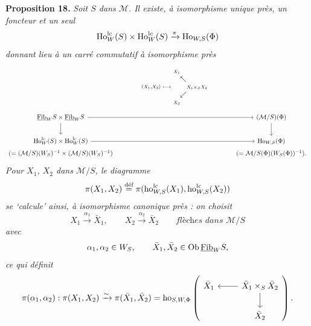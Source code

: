 \textbf{Proposition 18.} \textit{Soit $S$ dans $\mathcal{M}$. Il existe, à isomorphisme unique près, un foncteur et un seul}
\[
\mathrm{Ho}^{\mathrm{lc}}_W(S) \times \mathrm{Ho}^{\mathrm{lc}}_W(S) \xrightarrow{\pi} \mathrm{Ho}_{W,S}(\Phi)
\]
\textit{donnant lieu à un carré commutatif à isomorphisme près}
\[
\begin{tikzcd}[ampersand replacement=\&, column sep=large]
 \& {\scriptstyle (X_1,X_2)\ \longmapsto\ \begin{array}{@{}c@{}c@{}c@{}} \scriptstyle X_1 & & \\ & \nwarrow & \\ & & \scriptstyle X_1 \times_S X_2 \\ & \swarrow & \\ \scriptstyle X_2 & & \end{array}} \& \\[-3ex]
\Fibu_W S \times \Fibu_W S \arrow[rr] \arrow[d] \& \& (\mathcal{M}/S)(\Phi) \arrow[d] \\
\Ho^{\lc}_W(S) \times \Ho^{\lc}_W(S) \arrow[rr] \& \& \Ho_{W,S}(\Phi) \\[-4ex]
(= (\mathcal{M}/S)(W_S)^{-1} \times (\mathcal{M}/S)(W_S)^{-1}) \& \& (= \mathcal{M}/S(\Phi)(W_S(\Phi))^{-1}).
\end{tikzcd}
\]
\textit{Pour $X_1$, $X_2$ dans $\mathcal{M}/S$, le diagramme}
\[
\pi(X_1, X_2) \overset{\text{déf}}{=} \pi(\mathrm{ho}^{\mathrm{lc}}_{W,S}(X_1), \mathrm{ho}^{\mathrm{lc}}_{W,S}(X_2))
\]
\textit{se `calcule' ainsi, à isomorphisme canonique près : on choisit}
\[
X_1 \xrightarrow{\alpha_1} \bar{X}_1, \qquad X_2 \xrightarrow{\alpha_2} \bar{X}_2 \qquad \textit{flèches dans } \mathcal{M}/S
\]
\textit{avec}
\[
\alpha_1, \alpha_2 \in W_S, \qquad \bar{X}_1, \bar{X}_2 \in \mathrm{Ob}\, \underline{\mathrm{Fib}}_W S,
\]
\textit{ce qui définit}
\[
\pi(\alpha_1, \alpha_2) : \pi(X_1, X_2) \xrightarrow{\sim} \pi(\bar{X}_1, \bar{X}_2) = \ho_{S,W,\Phi}
\left(
\begin{tikzcd}[ampersand replacement=\&]
\bar{X}_1 \& \bar{X}_1 \times_S \bar{X}_2 \arrow[l] \arrow[d] \\
 \& \bar{X}_2
\end{tikzcd}
\right).
\]

\setcounter{footnote}{131}




